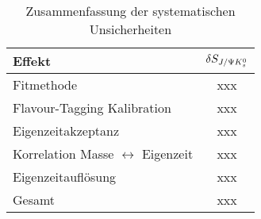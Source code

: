 \begin{table}[hptb]
\centering
\caption{Zusammenfassung der systematischen Unsicherheiten}
\label{tab:syst_gesamt}
\begin{tabular}{l c }
\hline \hline
Effekt & $\delta S_{J/\Psi K_s^0}$ \\ \hline
Fitmethode & xxx \\
Flavour-Tagging Kalibration & xxx \\
Eigenzeitakzeptanz & xxx \\
Korrelation Masse $\leftrightarrow$ Eigenzeit & xxx \\ 
Eigenzeitauflösung & xxx \\ \hline 
Gesamt & xxx \\ \hline \hline
\end{tabular}
\end{table}